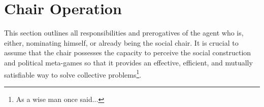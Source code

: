 





\section{Chair Operation}

This section outlines all responsibilities and prerogatives of the agent who is, either, nominating himself, or already being the social chair. It is crucial to assume that the chair possesses the capacity to perceive the social construction and political meta-games so that it provides an effective, efficient, and mutually satisfiable way to solve collective problems\footnote {As a wise man once said...}.

